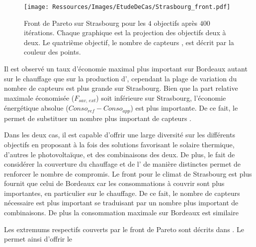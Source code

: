 \begin{figure}
    \centering
    \texttt{[image: Ressources/Images/EtudeDeCas/Strasbourg\_front.pdf]}
    \caption[Front de Pareto sur Strasbourg pour les $4$ objectifs après $400$ itérations]
             {Front de Pareto sur Strasbourg pour les $4$ objectifs après $400$ itérations.
              Chaque graphique est la projection des objectifs deux à deux.
              Le quatrième objectif, le nombre de capteurs , est décrit par la couleur des points.}
    \label{fig:front_pareto_strasbourg}
\end{figure}


Il est observé un taux d’économie maximal plus important sur Bordeaux autant sur le
chauffage que sur la production d’, cependant la plage de variation du
nombre de capteurs  est plus grande sur Strasbourg. Bien que la part relative
maximale économisée ($F_{sav,\,ext}$) soit inférieure sur Strasbourg, l’économie
énergétique absolue ($Conso_{ref} - Conso_{app}$) est plus importante. De ce fait,
le  permet de substituer un nombre plus important de capteurs .




Dans les
deux cas, il est capable d’offrir une large diversité sur les différents objectifs en
proposant à la fois des solutions favorisant le solaire thermique, d’autres le
photovoltaïque, et des combinaisons des deux. De plus, le fait de considérer la couverture
du chauffage et de l’ de manière distinctes permet de renforcer le nombre de
compromis. Le front pour le climat de Strasbourg est plus fournit que celui de Bordeaux
car les consommations à couvrir sont plus importantes, en particulier sur le chauffage.
De ce fait, le nombre de capteurs  nécessaire est plus important se traduisant par
un nombre plus important de combinaisons.
De plus la consommation maximale sur
Bordeaux est similaire


Les extremums respectifs couverts par le front de Pareto sont décrits dans .
Le  permet ainsi d’offrir le

